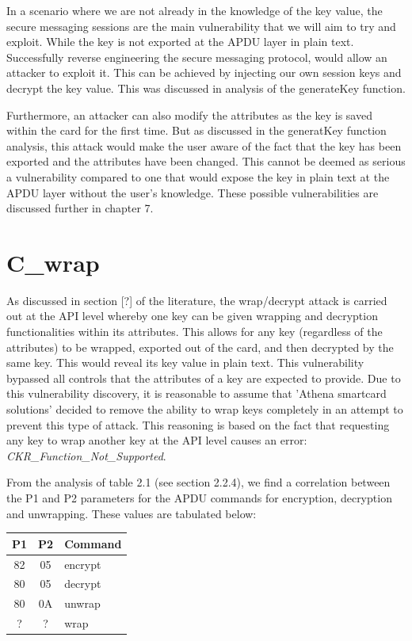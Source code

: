 \documentclass[bsc,frontabs,twoside,singlespacing,parskip,deptreport]{infthesis}     %
\begin{document}
In a scenario where we are not already in the knowledge of the key value, the secure messaging sessions are the main vulnerability that we will aim to try and exploit. While the key is not exported at the APDU layer in plain text. Successfully reverse engineering the secure messaging protocol, would allow an attacker to exploit it. This can be achieved by injecting our own session keys and decrypt the key value. This was discussed in analysis of the generateKey function.


Furthermore, an attacker can also modify the attributes as the key is saved within the card for the first time. But as discussed in the generatKey function analysis, this attack would make the user aware of the fact that the key has been exported and the attributes have been changed. This cannot be deemed as serious a vulnerability compared to one that would expose the key in plain text at the APDU layer without the user's knowledge. These possible vulnerabilities are discussed further in chapter 7.


\section{C\_wrap}
As discussed in section [?] of the literature, the wrap/decrypt attack is carried out at the API level whereby one key can be given wrapping and decryption functionalities within its attributes. This allows for any key (regardless of the attributes) to be wrapped, exported out of the card, and then decrypted by the same key. This would reveal its key value in plain text. This vulnerability bypassed all controls that the attributes of a key are expected to provide. Due to this vulnerability discovery, it is reasonable to assume that 'Athena smartcard solutions' decided to remove the ability to wrap keys completely in an attempt to prevent this type of attack. This reasoning is based on the fact that requesting any key to wrap another key at the API level causes an error: \textit{CKR\_Function\_Not\_Supported}.

From the analysis of table 2.1 (see section 2.2.4), we find a correlation between the P1 and P2 parameters for the APDU commands for encryption, decryption and unwrapping. These values are tabulated below:

\begin{table}[H]
\begin{tabular}{|c|c|l|}
\hline
P1 & P2 & Command\\
\hline
82 & 05 & encrypt\\
80 & 05 & decrypt\\
80 & 0A & unwrap\\
? & ? & wrap\\
\hline
\end{tabular}
\end{table}
\end{document}
